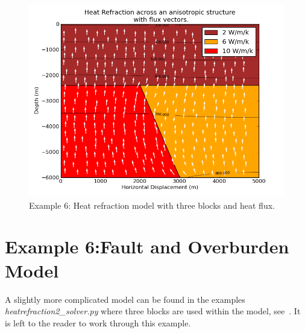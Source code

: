 \begin{figure}[ht]
\centerline{\includegraphics[width=4.in]{figures/heatrefraction2flux}}
\caption{Example 6: Heat refraction model with three blocks and heat flux.}
\label{fig:hr002qumodel}
\end{figure}

\section{Example 6:Fault and Overburden Model}
A slightly more complicated model can be found in the examples \textit{heatrefraction2_solver.py} where three blocks are used within the model, see~. It is left to the reader to work through this example.


